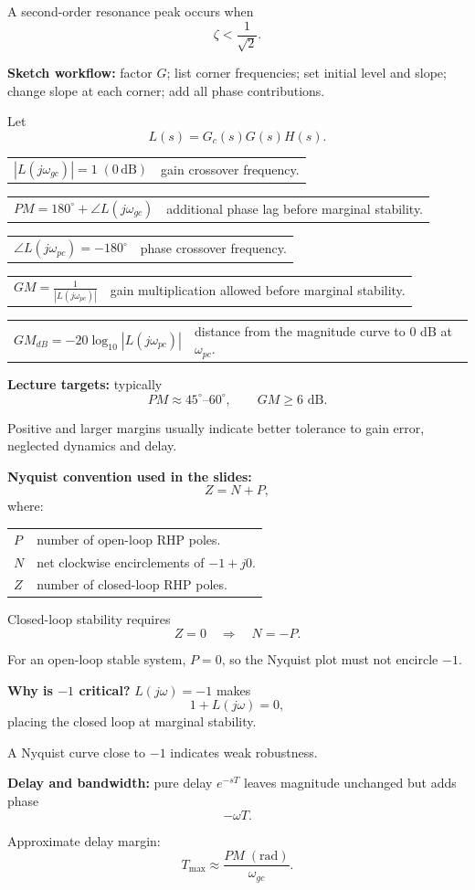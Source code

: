 \documentclass[a4paper,8pt]{extarticle}
\makeatletter
\newcommand{\topicdot}[1]{\tikz[baseline=-0.48ex]\fill[#1] (0,0) circle (0.64ex);}
\newcommand{\Fdot}{\topicdot{freqDot}}
\newcommand{\mybox}[2]{
\begin{tcolorbox}[
  enhanced,
  colback=lightblue!4!white,
  colframe=lightblue!76!black,
  colbacktitle=lightblue!49!white,
  boxrule=0.25pt,
  boxsep=0.25pt,
  left=0.75pt,right=0.75pt,top=0.55pt,bottom=0.55pt,
  toptitle=0.35pt,bottomtitle=0.25pt,
  arc=0.45pt,outer arc=0.45pt,
  title={\fontsize{4.85pt}{5.05pt}\selectfont\textbf{#1}},
  fonttitle=\bfseries,
  coltitle=black,
  before skip=0.55pt,after skip=0.55pt,
  fontupper=\fontsize{4.15pt}{4.52pt}\selectfont\RaggedRight
]
#2
\end{tcolorbox}}
\newcommand{\frow}[2]{%
\begin{tabularx}{\linewidth}{@{}>{$\displaystyle}l<{$}@{\hspace{3pt}}X@{}}
#1 & #2
\end{tabularx}\vspace{0.05pt}}
\newcommand{\tinyhead}[1]{\textbf{#1}\;}
\makeatother
\begin{document}
\begin{multicols}{4}
{A second-order resonance peak occurs when
\[
\zeta<\frac{1}{\sqrt2}.
\]

\tinyhead{Sketch workflow:}
factor $G$; list corner frequencies; set initial level and slope; change slope at each corner; add all phase contributions.
}

\mybox{GM, PM, Nyquist \& Robustness \Fdot}{
Let
\[
L(s)=G_c(s)G(s)H(s).
\]

\frow{|L(j\omega_{gc})|=1\;(0\,\mathrm{dB})}
{gain crossover frequency.}

\frow{PM=180^\circ+\angle L(j\omega_{gc})}
{additional phase lag before marginal stability.}

\frow{\angle L(j\omega_{pc})=-180^\circ}
{phase crossover frequency.}

\frow{GM=\frac{1}{|L(j\omega_{pc})|}}
{gain multiplication allowed before marginal stability.}

\frow{GM_{dB}=-20\log_{10}|L(j\omega_{pc})|}
{distance from the magnitude curve to $0$ dB at $\omega_{pc}$.}

\tinyhead{Lecture targets:}
typically
\[
PM\approx45^\circ\text{--}60^\circ,
\qquad
GM\geq6\text{ dB}.
\]

Positive and larger margins usually indicate better tolerance to gain error, neglected dynamics and delay.

\tinyhead{Nyquist convention used in the slides:}
\[
Z=N+P,
\]
where:

\begin{tabularx}{\linewidth}{@{}lX@{}}
$P$ & number of open-loop RHP poles.\\
$N$ & net clockwise encirclements of $-1+j0$.\\
$Z$ & number of closed-loop RHP poles.\\
\end{tabularx}

Closed-loop stability requires
\[
Z=0
\quad\Rightarrow\quad
N=-P.
\]

For an open-loop stable system, $P=0$, so the Nyquist plot must not encircle $-1$.

\tinyhead{Why is $-1$ critical?}
$L(j\omega)=-1$ makes
\[
1+L(j\omega)=0,
\]
placing the closed loop at marginal stability.

A Nyquist curve close to $-1$ indicates weak robustness.

\tinyhead{Delay and bandwidth:}
pure delay $e^{-sT}$ leaves magnitude unchanged but adds phase
\[
-\omega T.
\]

Approximate delay margin:
\[
T_{\max}\approx
\frac{PM\;(\mathrm{rad})}{\omega_{gc}}.
\]

}
\end{multicols}
\end{document}
